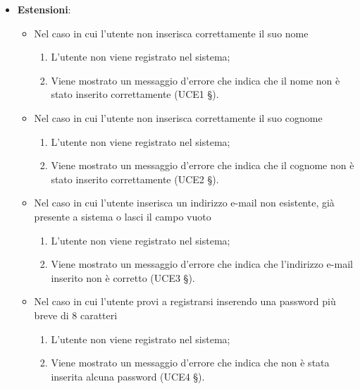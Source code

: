 \begin{itemize}
\item \textbf{Estensioni}:
\begin{itemize}
\item{Nel caso in cui l'utente non inserisca correttamente il suo nome}
\begin{enumerate}
	\item L'utente non viene registrato nel sistema;
	\item Viene mostrato un messaggio d'errore che indica che il nome non è stato inserito correttamente (UCE1 §).
\end{enumerate}
\item{Nel caso in cui l'utente non inserisca correttamente il suo cognome}
\begin{enumerate}
	\item L'utente non viene registrato nel sistema;
	\item Viene mostrato un messaggio d'errore che indica che il cognome non è stato inserito correttamente (UCE2 §).
\end{enumerate}
\item Nel caso in cui l’utente inserisca un indirizzo e-mail non esistente, già presente a sistema o lasci il campo vuoto
\begin{enumerate}
	\item L’utente non viene registrato nel sistema;
	\item Viene mostrato un messaggio d’errore che indica che l'indirizzo e-mail inserito non è corretto (UCE3 §).
\end{enumerate}
\item Nel caso in cui l’utente provi a registrarsi inserendo una password più breve di 8 caratteri
\begin{enumerate}
	\item L’utente non viene registrato nel sistema;
	\item Viene mostrato un messaggio d’errore che indica che non è stata inserita alcuna password (UCE4 §).
\end{enumerate}
\end{itemize}
\end{itemize}